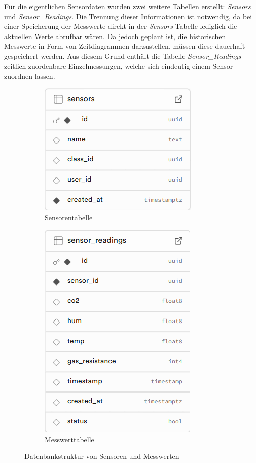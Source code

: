 \begin{inhalt}
Für die eigentlichen Sensordaten wurden zwei weitere Tabellen erstellt: \textit{Sensors} und \textit{Sensor\_Readings}. Die Trennung dieser Informationen ist notwendig, da bei einer Speicherung der Messwerte direkt in der \textit{Sensors}-Tabelle lediglich die aktuellen Werte abrufbar wären. Da jedoch geplant ist, die historischen Messwerte in Form von Zeitdiagrammen darzustellen, müssen diese dauerhaft gespeichert werden. Aus diesem Grund enthält die Tabelle \textit{Sensor\_Readings} zeitlich zuordenbare Einzelmessungen, welche sich eindeutig einem Sensor zuordnen lassen.

\begin{figure}[!htb]
  \centering
  \begin{subfigure}[b]{0.45\textwidth}
    \centering
    \includegraphics[scale=0.45]{files/Thomas/pics/Datenbank_Design/sensors.png}
    \caption[Tabelle Sensors]{Sensorentabelle}
    \label{fig:sensors_tabelle}
  \end{subfigure}
  \hfill
  \begin{subfigure}[b]{0.45\textwidth}
    \centering
    \includegraphics[scale=0.45]{files/Thomas/pics/Datenbank_Design/sensor_readings.png}
    \caption[Tabelle Sensor Readings]{Messwerttabelle}
    \label{fig:sensor_readings_tabelle}
  \end{subfigure}
  \caption[Sensor- und Messwerttabellen]{Datenbankstruktur von Sensoren und Messwerten}
  \label{fig:sensors_sensor_readings}
\end{figure}


\end{inhalt}
